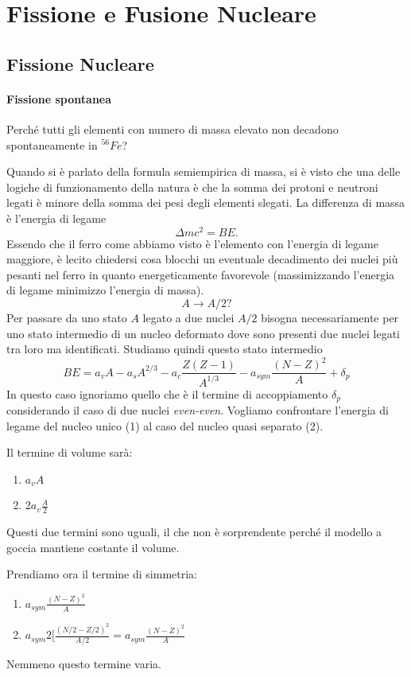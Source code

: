 \section{Fissione e Fusione Nucleare}

\subsection{Fissione Nucleare}
\paragraph{Fissione spontanea}
Perché tutti gli elementi con numero di massa elevato non decadono spontaneamente in $^{56}Fe$?

Quando si è parlato della formula semiempirica di massa, si è visto che una delle logiche di funzionamento della natura è che la somma dei protoni e neutroni legati è minore della somma dei pesi degli elementi slegati. 
La differenza di massa è l'energia di legame
\[
\Delta mc^2=BE.
\]
Essendo che il ferro come abbiamo visto è l'elemento con l'energia di legame maggiore, è lecito chiedersi cosa blocchi un eventuale decadimento dei nuclei più pesanti nel ferro in quanto energeticamente favorevole (massimizzando l'energia di legame minimizzo l'energia di massa).
\[
A\to A/2?
\]
Per passare da uno stato $A$ legato a due nuclei $A/2$ bisogna necessariamente per uno stato intermedio di un nucleo deformato dove sono presenti due nuclei legati tra loro ma identificati.
Studiamo quindi questo stato intermedio 
\begin{equation}
BE= a_v A-a_s A^{2/3}-a_c \frac{Z(Z-1)}{A^{1/3}}-a_{sym}\frac{(N-Z)^2}{A}+\delta_p
\end{equation}
In questo caso ignoriamo quello che è il termine di accoppiamento $\delta_p$ considerando il caso di due nuclei \emph{even-even}.
Vogliamo confrontare l'energia di legame del nucleo unico (1) al caso del nucleo quasi separato (2).

Il termine di volume sarà:
\begin{enumerate}
\item $a_v A$
\item $2a_v \frac{A}{2}$
\end{enumerate}
Questi due termini sono uguali, il che non è sorprendente perché il modello a goccia mantiene costante il volume.

Prendiamo ora il termine di simmetria:
\begin{enumerate}
\item $a_{sym}\frac{(N-Z)^2}{A}$
\item $a_{sym} 2\biggl[\frac{(N/2 -Z/2)^2}{A/2}=a_{sym}\frac{(N-Z)^2}{A}$
\end{enumerate}
Nemmeno questo termine varia.

